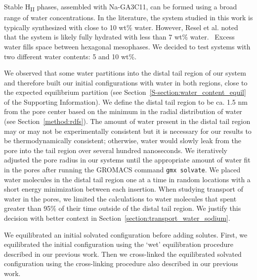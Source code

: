 \documentclass[journal=jpcbfk,manuscript=article]{achemso}
\begin{document}
  Stable H\textsubscript{II} phases, assembled with Na-GA3C11, can be formed
  using a broad range of water concentrations. In the literature, the system 
  studied in this work is typically synthesized with close to 10 wt\% water.
  \cite{smith_ordered_1997, zhou_new_2007} However, Resel et al. noted that the
  system is likely fully hydrated with less than 7 wt\% water.~\cite{resel_h2-phase_2000}
  Excess water fills space between hexagonal mesophases. We decided to test 
  systems with two different water contents: 5 and 10 wt\%.

  We observed that some water partitions into the distal tail region of our system and therefore
  built our initial configurations with water in both regions, close to the expected
  equilibrium partition (see Section~\ref{S-section:water_content_equil} of the Supporting
  Information). We define the distal tail region to be ca. 1.5 nm from the pore
  center based on the minimum in the radial distribution of water
  (see Section~\ref{method:rdfs}). The amount of water present in the distal tail region
  may or may not be experimentally consistent but it is necessary for our results to be 
  thermodynamically consistent; otherwise, water would slowly leak from the pore into the
  tail region over several hundred nanoseconds. We iteratively adjusted the pore radius in our systems
  until the appropriate amount of water fit in the pores after running the GROMACS command
  \texttt{gmx solvate}. We placed water molecules in the distal tail region one at a time
  in random locations with a short energy minimization between each insertion. When 
  studying transport of water in the pores, we limited the calculations to water molecules
  that spent greater than 95\% of their time outside of the distal tail region. We 
  justify this decision with better context in Section~\ref{section:transport_water_sodium}.

  We equilibrated an initial solvated configuration before adding solutes. First, we 
  equilibrated the initial configuration using the `wet' equilibration procedure 
  described in our previous work. Then we cross-linked the equilibrated solvated 
  configuration using the cross-linking procedure also described in our previous 
  work.~\cite{coscia_understanding_2019}
\end{document}
